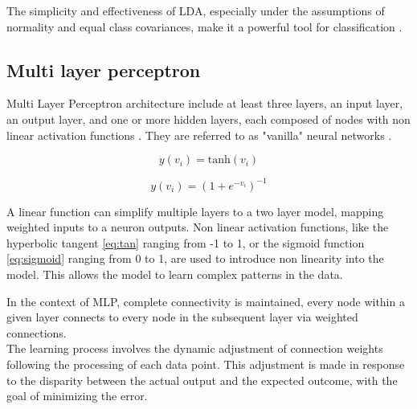             The simplicity and effectiveness of LDA, especially under the assumptions of normality and equal class covariances, make it a powerful tool for classification \cite{balakrishnama_linear_nodate}.

        \subsection{Multi layer perceptron}
            Multi Layer Perceptron architecture include at least three layers, an input layer, an output layer, and one or more hidden layers, each composed of nodes with non linear activation functions \cite{svozil_introduction_1997}. They are referred to as "vanilla" neural networks \cite{hastie_elements_2009}.

        \begin{equation}\label{eq:tan}
            y(v_i) = \text{tanh}(v_i) 
        \end{equation}

        \begin{equation}\label{eq:sigmoid}
            y(v_i) = (1+e^{-v_i})^{-1} 
        \end{equation}

            A linear function can simplify multiple layers to a two layer model, mapping weighted inputs to a neuron outputs. Non linear activation functions, like the hyperbolic tangent \ref{eq:tan} ranging from -1 to 1, or the sigmoid function \ref{eq:sigmoid} ranging from 0 to 1, are used to introduce non linearity into the model. This allows the model to learn complex patterns in the data.

        \newpage

        In the context of MLP, complete connectivity is maintained, every node within a given layer connects to every node in the subsequent layer via weighted connections. \\
        The learning process involves the dynamic adjustment of connection weights following the processing of each data point. This adjustment is made in response to the disparity between the actual output and the expected outcome, with the goal of minimizing the error.


